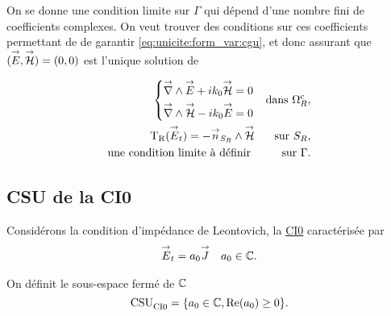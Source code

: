   On se donne une condition limite sur \(\Gamma\) qui dépend d'une nombre fini de coefficients complexes.
  On veut trouver des conditions sur ces coefficients permettant de de garantir  \eqref{eq:unicite:form_var:cgu}, et donc assurant que \(({\overset{\rightarrow}{E}},{\overset{\rightarrow}{\mathcal{H}}}) = (0,0)\) est l'unique solution de



  \begin{equation}
    \label{eq:unicite:probleme_sans_ci}
    \begin{aligned}
      \left\lbrace
      \begin{aligned}
        {\overset{\rightarrow}{\nabla}}\wedge{{\overset{\rightarrow}{E}}} + ik_0{\overset{\rightarrow}{\mathcal{H}}} &= 0
        \\
        {\overset{\rightarrow}{\nabla}}\wedge{{\overset{\rightarrow}{\mathcal{H}}}} - ik_0{\overset{\rightarrow}{E}} &= 0
      \end{aligned}
      \right. && \text{dans \(\Omega^c_R\)},
      \\
      \operatorname{T_R}({\overset{\rightarrow}{E}}_t) = - {\overset{\rightarrow}{n}}_{S_R} \wedge {\overset{\rightarrow}{\mathcal{H}}} && \text{sur \(S_R\),}
      \\
      \text{une condition limite à définir }  && \text{sur \(\Gamma\).}
    \end{aligned}
  \end{equation}

  \subsection{CSU de la CI0}
    Considérons la condition d’impédance de Leontovich, la \hyperlink{ci0}{CI0} caractérisée par
    \begin{align}
      \label{eq:unicite:ci0}
      {\overset{\rightarrow}{E}}_t = a_0 {\overset{\rightarrow}{J}} &&  a_0 \in \mathbb C.
    \end{align}

    \begin{defn}
      \label{def:csu:ci0}
      On définit le sous-espace fermé de \(\mathbb C\)
      \begin{equation*}
        \operatorname{CSU}_{\operatorname{CI0}}^{{}} = \lbrace a_0 \in \mathbb C, \operatorname{Re}(a_0) \ge 0 \rbrace.
      \end{equation*}
    \end{defn}

